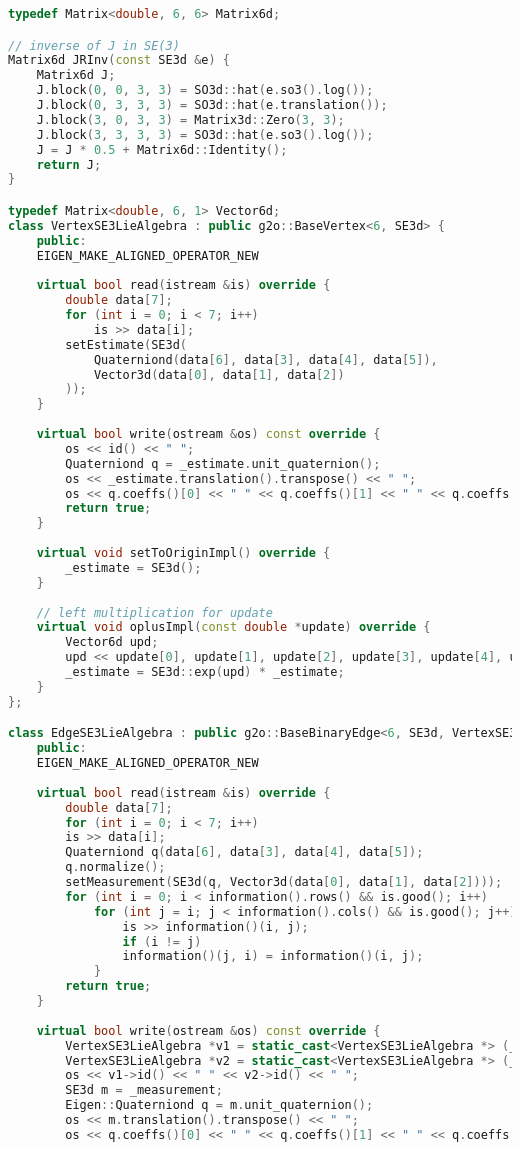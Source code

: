 \begin{lstlisting}[language=c++,caption=slambook2/ch10/pose\_graph\_g2o\_lie\_algebra.cpp()part)]
typedef Matrix<double, 6, 6> Matrix6d;

// inverse of J in SE(3)
Matrix6d JRInv(const SE3d &e) {
	Matrix6d J;
	J.block(0, 0, 3, 3) = SO3d::hat(e.so3().log());
	J.block(0, 3, 3, 3) = SO3d::hat(e.translation());
	J.block(3, 0, 3, 3) = Matrix3d::Zero(3, 3);
	J.block(3, 3, 3, 3) = SO3d::hat(e.so3().log());
	J = J * 0.5 + Matrix6d::Identity();
	return J;
}

typedef Matrix<double, 6, 1> Vector6d;
class VertexSE3LieAlgebra : public g2o::BaseVertex<6, SE3d> {
	public:
	EIGEN_MAKE_ALIGNED_OPERATOR_NEW
	
	virtual bool read(istream &is) override {
		double data[7];
		for (int i = 0; i < 7; i++)
			is >> data[i];
		setEstimate(SE3d(
			Quaterniond(data[6], data[3], data[4], data[5]),
			Vector3d(data[0], data[1], data[2])
		));
	}
	
	virtual bool write(ostream &os) const override {
		os << id() << " ";
		Quaterniond q = _estimate.unit_quaternion();
		os << _estimate.translation().transpose() << " ";
		os << q.coeffs()[0] << " " << q.coeffs()[1] << " " << q.coeffs()[2] << " " << q.coeffs()[3] << endl;
		return true;
	}
	
	virtual void setToOriginImpl() override {
		_estimate = SE3d();
	}
	
	// left multiplication for update
	virtual void oplusImpl(const double *update) override {
		Vector6d upd;
		upd << update[0], update[1], update[2], update[3], update[4], update[5];
		_estimate = SE3d::exp(upd) * _estimate;
	}
};

class EdgeSE3LieAlgebra : public g2o::BaseBinaryEdge<6, SE3d, VertexSE3LieAlgebra, VertexSE3LieAlgebra> {
	public:
	EIGEN_MAKE_ALIGNED_OPERATOR_NEW
	
	virtual bool read(istream &is) override {
		double data[7];
		for (int i = 0; i < 7; i++)
		is >> data[i];
		Quaterniond q(data[6], data[3], data[4], data[5]);
		q.normalize();
		setMeasurement(SE3d(q, Vector3d(data[0], data[1], data[2])));
		for (int i = 0; i < information().rows() && is.good(); i++)
			for (int j = i; j < information().cols() && is.good(); j++) {
				is >> information()(i, j);
				if (i != j)
				information()(j, i) = information()(i, j);
			}
		return true;
	}
	
	virtual bool write(ostream &os) const override {
		VertexSE3LieAlgebra *v1 = static_cast<VertexSE3LieAlgebra *> (_vertices[0]);
		VertexSE3LieAlgebra *v2 = static_cast<VertexSE3LieAlgebra *> (_vertices[1]);
		os << v1->id() << " " << v2->id() << " ";
		SE3d m = _measurement;
		Eigen::Quaterniond q = m.unit_quaternion();
		os << m.translation().transpose() << " ";
		os << q.coeffs()[0] << " " << q.coeffs()[1] << " " << q.coeffs()[2] << " " << q.coeffs()[3] << " ";
		

\end{lstlisting}
